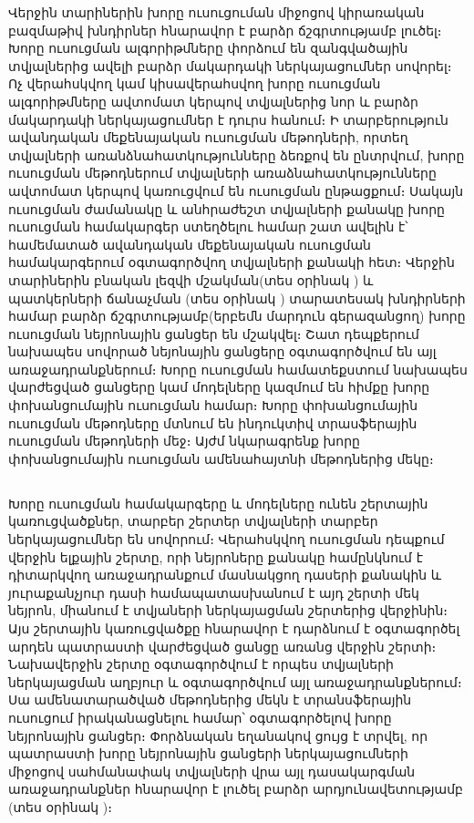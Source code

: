 \documentclass[12pt]{article}
\begin{document}
Վերջին տարիներին խորը ուսուցուման միջոցով կիրառական բազմաթիվ խնդիրներ հնարավոր է բարձր ճշգրտությամբ լուծել։ Խորը ուսուցման ալգորիթմները փորձում են զանգվածային տվյալներից ավելի բարձր մակարդակի  ներկայացումներ սովորել։  Ոչ վերահսկվող կամ կիսավերահսվող խորը ուսուցման ալգորիթմները ավտոմատ կերպով տվյալներից նոր և բարձր մակարդակի ներկայացումներ է դուրս հանում։ Ի տարբերություն ավանդական մեքենայական ուսուցման մեթոդների, որտեղ  տվյալների առանձնահատկությունները ձեռքով են ընտրվում,  խորը ուսուցման մեթոդներում տվյալների առաձնահատկությունները ավտոմատ կերպով կառուցվում են ուսուցման ընթացքում։ Սակայն ուսուցման ժամանակը և անհրաժեշտ տվյալների քանակը խորը ուսուցման համակարգեր ստեղծելու համար շատ ավելին է՝ համեմատած ավանդական մեքենայական ուսուցման համակարգերում օգտագործվող տվյալների քանակի հետ։ Վերջին տարիներին բնական լեզվի մշակման(տես օրինակ \cite{bib_item_19, bib_item_6, bib_item_7}) և պատկերների ճանաչման (տես օրինակ \cite{bib_item_15, bib_item_16, bib_item_4, bib_item_5}) տարատեսակ խնդիրների համար բարձր ճշգրտությամբ(երբեմն մարդուն գերազանցող) խորը ուսուցման նեյրոնային ցանցեր են  մշակվել։ Շատ դեպքերում նախապես սովորած նեյոնային ցանցերը օգտագործվում են այլ առաջադրանքներում։ Խորը ուսուցման համատեքստում նախապես վարժեցված ցանցերը կամ մոդելները կազմում են հիմքը  խորը փոխանցումային ուսուցման համար։ Խորը փոխանցումային ուսուցման մեթոդները մտնում են ինդուկտիվ տրասֆերային ուսուցման մեթոդների մեջ։ Այժմ նկարագրենք խորը փոխանցումային ուսուցման ամենահայտնի մեթոդներից մեկը։ \\

\begin{center}
\subsection*{
 } 
 \end{center}
 \noindent
{}
{}

Խորը ուսուցման համակարգերը և մոդելները ունեն շերտային կառուցվածքներ, տարբեր շերտեր տվյալների տարբեր ներկայացումներ են սովորում։ Վերահսկվող ուսուցման դեպքում վերջին ելքային շերտը, որի նեյրոները քանակը համընկնում  է  դիտարկվող առաջադրանքում մասնակցող դասերի քանակին և յուրաքանչյուր դասի համապատասխանում է այդ շերտի մեկ նեյրոն,   միանում է տվյաների ներկայացման շերտերից վերջինին։ Այս շերտային կառուցվածքը հնարավոր է դարձնում է օգտագործել արդեն պատրաստի վարժեցված ցանցը առանց վերջին շերտի։ Նախավերջին շերտը օգտագործվում է որպես տվյալների ներկայացման աղբյուր և օգտագործվում այլ առաջադրանքներում։  Սա ամենատարածված մեթոդներից մեկն է տրանսֆերային ուսուցում իրականացնելու համար՝ օգտագործելով խորը նեյրոնային ցանցեր։ Փորձնական եղանակով ցույց է տրվել, որ պատրաստի խորը նեյրոնային ցանցերի ներկայացումների միջոցով սահմանափակ տվյալների վրա այլ դասակարգման առաջադրանքներ հնարավոր է լուծել բարձր արդյունավետությամբ (տես օրինակ \cite{bib_item_8})։ \\
\end{document}
